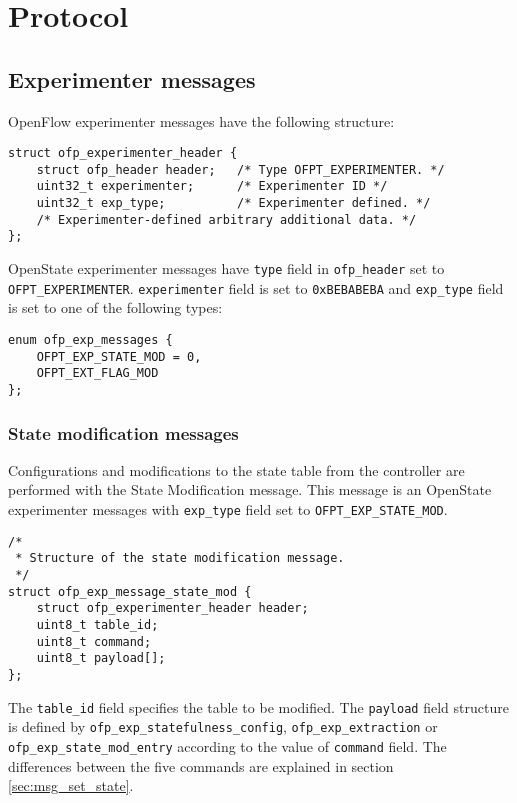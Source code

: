 
\chapter{Protocol}
\label{chap:protocol}

\section{Experimenter messages}
OpenFlow experimenter messages have the following structure:

\begin{verbatim}
struct ofp_experimenter_header {
    struct ofp_header header;   /* Type OFPT_EXPERIMENTER. */
    uint32_t experimenter;      /* Experimenter ID */
    uint32_t exp_type;          /* Experimenter defined. */
    /* Experimenter-defined arbitrary additional data. */
};
\end{verbatim}
OpenState experimenter messages have \texttt{type} field in \texttt{ofp\_header} set to \texttt{OFPT\_EXPERIMENTER}. \texttt{experimenter} field is set to \texttt{0xBEBABEBA} and \texttt{exp\_type} field is set to one of the following types:

\begin{verbatim}
enum ofp_exp_messages {
    OFPT_EXP_STATE_MOD = 0,
    OFPT_EXT_FLAG_MOD
};
\end{verbatim}

\subsection{State modification messages}

\label{sec:msg_set_state_proto}

Configurations and modifications to the state table from the controller are performed with the State Modification message.
This message is an OpenState experimenter messages with \texttt{exp\_type} field set to \texttt{OFPT\_EXP\_STATE\_MOD}.

\begin{verbatim}
/*
 * Structure of the state modification message.
 */
struct ofp_exp_message_state_mod {
    struct ofp_experimenter_header header;
    uint8_t table_id;
    uint8_t command;
    uint8_t payload[];
};
\end{verbatim}
The \texttt{table\_id} field specifies the table to be modified. The \texttt{payload} field structure is defined by \texttt{ofp\_exp\_statefulness\_config}, \texttt{ofp\_exp\_extraction} or \texttt{ofp\_exp\_state\_mod\_entry} according to the value of \texttt{command} field. The differences between the five commands are explained in section \ref{sec:msg_set_state}.

